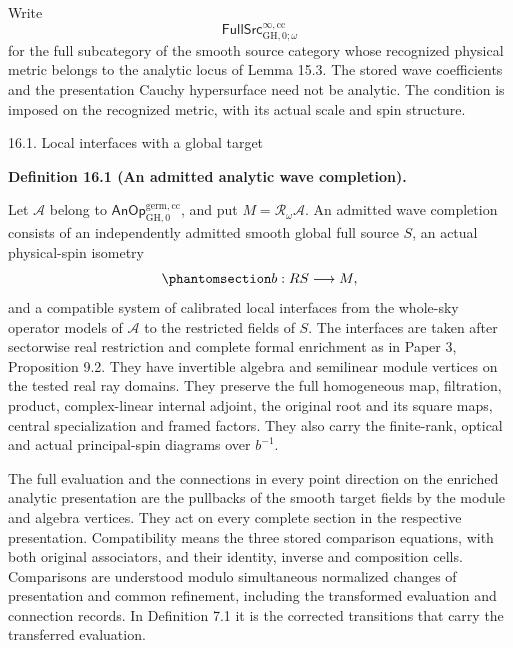 \documentclass[
  english,
  11pt,
  reqno]{amsart}
\makeatletter
\newcommand{\paperstatementsection}{\@startsection{subsection}{2}%
  \z@{.5\linespacing\@plus.7\linespacing}{.35\baselineskip}%
  {\normalfont\bfseries}}
\newcommand{\paperfirststatement}[1]{%
  {\normalfont\bfseries #1\par}%
  \nobreak\@afterindenttrue\@afterheading}
\makeatother
\begin{document}
Write \[
\mathsf{FullSrc}^{\infty,\mathrm{cc}}_{\mathrm{GH},0;\omega}
\] for the full subcategory of the smooth source category whose
recognized physical metric belongs to the analytic locus of Lemma 15.3.
The stored wave coefficients and the presentation Cauchy hypersurface
need not be analytic. The condition is imposed on the recognized metric,
with its actual scale and spin structure.

\protect{}\label{sec:analytic-wave-completion-data}
\paperstatementsection{16.1. Local interfaces with a global
target}\label{local-interfaces-with-a-global-target}
\paperfirststatement{\protect{}\label{def:analytic-admitted-wave-completion}Definition 16.1 (An admitted analytic wave completion).}

Let \(\mathcal A\) belong to
\(\mathsf{AnOp}^{\mathrm{germ},\mathrm{cc}}_{\mathrm{GH},0}\), and put
\(M=\mathcal R_\omega\mathcal A\). An admitted wave completion consists
of an independently admitted smooth global full source \(S\), an actual
physical-spin isometry
\begin{equation}\protect\phantomsection\label{eq:analytic-wave-completion-marking}{
b:RS\longrightarrow M,
}\end{equation} and a compatible system of calibrated local interfaces
from the whole-sky operator models of \(\mathcal A\) to the restricted
fields of \(S\). The interfaces are taken after sectorwise real
restriction and complete formal enrichment as in Paper 3, Proposition
9.2. They have invertible algebra and semilinear module vertices on the
tested real ray domains. They preserve the full homogeneous map,
filtration, product, complex-linear internal adjoint, the original root
and its square maps, central specialization and framed factors. They
also carry the finite-rank, optical and actual principal-spin diagrams
over \(b^{-1}\).

The full evaluation and the connections in every point direction on the
enriched analytic presentation are the pullbacks of the smooth target
fields by the module and algebra vertices. They act on every complete
section in the respective presentation. Compatibility means the three
stored comparison equations, with both original associators, and their
identity, inverse and composition cells. Comparisons are understood
modulo simultaneous normalized changes of presentation and common
refinement, including the transformed evaluation and connection records.
In Definition 7.1 it is the corrected transitions that carry the
transferred evaluation.
\end{document}
